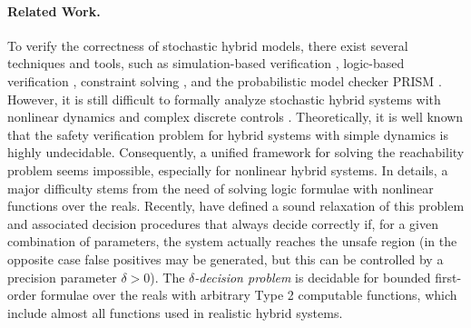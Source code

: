 \paragraph{Related Work.}To verify the correctness of stochastic hybrid models, there exist several techniques and tools, such as simulation-based verification \cite{zuliani2010bayesian, abate2007probabilistic}, logic-based verification \cite{platzer2011stochastic}, constraint solving \cite{franzle2008stochastic}, and the probabilistic model checker PRISM \cite{website:prism}. However, it is still difficult to formally analyze stochastic hybrid systems with nonlinear dynamics and complex discrete controls \cite{alur2011formal, henzinger2000theory}. Theoretically, it is well known that the safety verification problem for hybrid systems with simple dynamics is highly undecidable. Consequently, a unified framework for solving the reachability problem seems impossible, especially for nonlinear hybrid systems. In details, a major difficulty stems from the need of solving logic formulae with nonlinear functions over the reals. Recently, \cite{gao2013dreal, gao2013satisfiability} 
have defined a sound relaxation of this problem and associated decision procedures that always decide correctly 
if, for a given combination of parameters, the system actually reaches the unsafe region (in the opposite case
false positives may be generated, but this can be controlled by a precision parameter $\delta>0$).
The $\delta${\em -decision problem} is decidable for bounded first-order formulae over the reals with arbitrary 
Type 2 computable functions, which include almost all functions used in realistic hybrid systems.   
